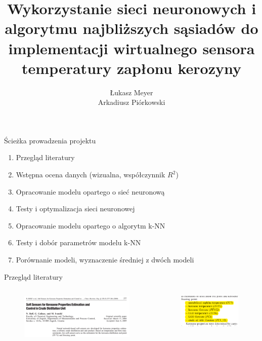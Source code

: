 \documentclass{beamer}
\title{Wykorzystanie sieci neuronowych i algorytmu najbliższych sąsiadów do implementacji wirtualnego sensora temperatury zapłonu kerozyny}
\author{Łukasz Meyer\\  Arkadiusz Piórkowski}
\begin{document}
\begin{frame}
	\titlepage
\end{frame}

\begin{frame}{Ścieżka prowadzenia projektu}
\begin{enumerate}
	\item Przegląd literatury
	\item Wstępna ocena danych (wizualna, współczynnik $R^2$)
	\item Opracowanie modelu opartego o sieć neuronową
	\item Testy i optymalizacja sieci neuronowej
	\item Opracowanie modelu opartego o algorytm k-NN
	\item Testy i dobór parametrów modelu k-NN
	\item Porównanie modeli, wyznaczenie średniej z dwóch modeli
\end{enumerate}
\end{frame}

\begin{frame}{Przegląd literatury}
\begin{columns}
\begin{figure}
	\includegraphics[width=\linewidth]{cabeq_1}
\end{figure}
\begin{figure}
	\includegraphics[width=\linewidth]{cabeq_2}
\end{figure}
\end{columns}

\end{frame}
\end{document}
